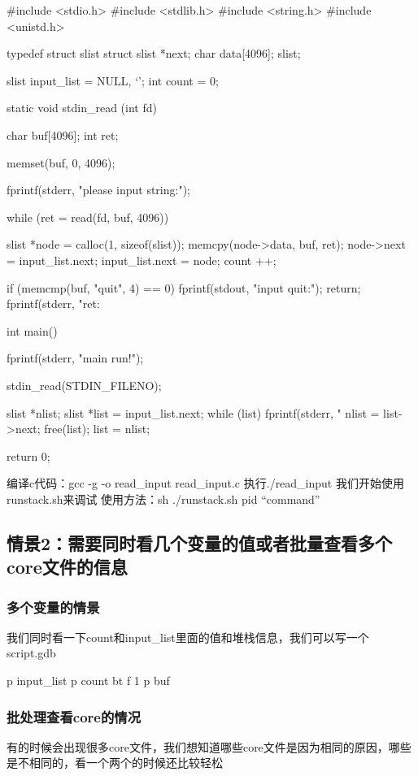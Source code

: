 \begin{Code}
	#include <stdio.h>
	#include <stdlib.h>
	#include <string.h>
	#include <unistd.h>
	
	typedef struct slist {
		struct slist *next;
		char data[4096];
	} slist;
	
	slist input_list = {NULL, {‘\0’}};
	int count = 0;
	
	static void stdin_read (int fd)
	{
		char buf[4096];
		int ret;
		
		memset(buf, 0, 4096);
		
		fprintf(stderr, "please input string:");
		
		while (ret = read(fd, buf, 4096)) {
			
			slist *node = calloc(1, sizeof(slist));
			memcpy(node->data, buf, ret);
			node->next = input_list.next;
			input_list.next = node;
			count ++;
			
			if (memcmp(buf, "quit", 4) == 0) {
				fprintf(stdout, "input quit:\n");
				return;
			}
			fprintf(stderr, "ret: %
		}
	}
	
	int main()
	{
		fprintf(stderr, "main run!\n");
		
		stdin_read(STDIN_FILENO);
		
		slist *nlist;
		slist *list = input_list.next;
		while (list) {
			fprintf(stderr, "%
			nlist = list->next;
			free(list);
			list = nlist;
		}
		
		return 0;
	}
\end{Code}

编译c代码：gcc -g -o read_input read_input.c
执行./read_input 我们开始使用runstack.sh来调试
使用方法：sh ./runstack.sh pid “command”

\subsection{情景2：需要同时看几个变量的值或者批量查看多个core文件的信息}
\subsubsection{多个变量的情景}
我们同时看一下count和input_list里面的值和堆栈信息，我们可以写一个script.gdb
\begin{Code}
	p input_list
	p count
	bt
	f 1
	p buf
\end{Code}
\subsubsection{批处理查看core的情况}
有的时候会出现很多core文件，我们想知道哪些core文件是因为相同的原因，哪些是不相同的，看一个两个的时候还比较轻松

